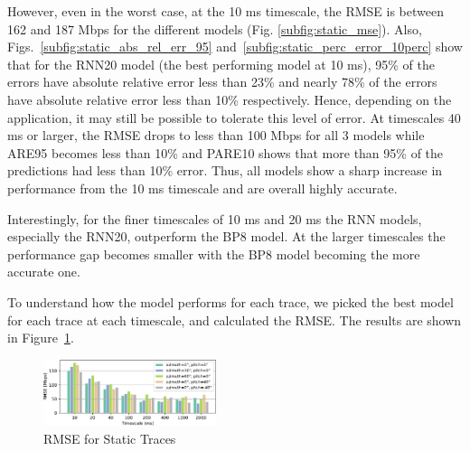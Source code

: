 \documentclass[sigconf,anonymous]{acmart}
\begin{document}
However, even in the worst case, at the 10 ms timescale, the RMSE is between 162 and 187 Mbps for the different models (Fig. \ref{subfig:static_mse}). Also, Figs.~\ref{subfig:static_abs_rel_err_95} and~\ref{subfig:static_perc_error_10perc} show that for the RNN20 model (the best performing model at 10 ms), 95\% of the errors have absolute relative error less than 23\% and nearly 78\% of the errors have absolute relative error less than 10\% respectively. Hence, depending on the application, it may still be possible to tolerate this level of error. At timescales 40 ms or larger, the RMSE drops to less than 100 Mbps for all 3 models while ARE95 becomes less than 10\% and PARE10 shows that more than 95\% of the predictions had less than 10\% error. Thus, all models show a sharp increase in performance from the 10 ms timescale and are overall highly accurate.

Interestingly, for the finer timescales of 10 ms and 20 ms the RNN models, especially the RNN20, outperform the BP8 model. At the larger timescales the performance gap becomes smaller with the BP8 model becoming the more accurate one.



To understand how the model performs for each trace, we picked the best model for each trace at each timescale, and calculated the RMSE. The results are shown in Figure~\ref{figure: RMSE for Static Traces}. 

\begin{figure}[h]
\includegraphics[width=0.45\textwidth]{figs/rmse_along_angle.pdf}
\caption{RMSE for Static Traces}
\label{figure: RMSE for Static Traces}
\end{figure}
\end{document}
